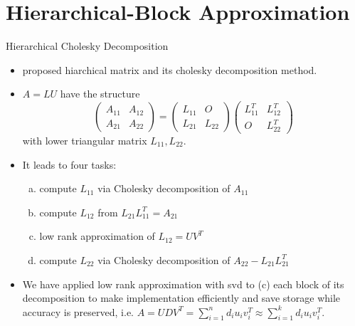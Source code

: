 \section{Hierarchical-Block Approximation}

\begin{frame}{Hierarchical Cholesky Decomposition}
\begin{itemize}
	\item \citet{hackbusch2015hierarchical} proposed hiarchical matrix and its cholesky decomposition method.
	\item $A=LU$ have the structure
	$$\begin{pmatrix}A_{11}&A_{12}\\A_{21}&A_{22}\end{pmatrix}=\begin{pmatrix}L_{11}&O\\L_{21}&L_{22}\end{pmatrix}\begin{pmatrix}L_{11}^T&L_{12}^T\\O&L_{22}^T\end{pmatrix}$$
	with lower triangular matrix $L_{11},L_{22}$.
	\item It leads to four tasks:
		\begin{enumerate}[(a)]
			\item compute $L_{11}$ via Cholesky decomposition of $A_{11}$
			\item compute $L_{12}$ from $L_{21}L_{11}^T = A_{21}$
			\item low rank approximation of $L_{12}=UV^T$
			\item compute $L_{22}$ via Cholesky decomposition of $A_{22}-L_{21}L_{21}^T$
		\end{enumerate}
	\item We have applied low rank approximation with svd to (c) each block of its decomposition to make implementation efficiently and save storage while accuracy is preserved, i.e. $A=UDV^T=\sum_{i=1}^n d_i u_iv_i^T\approx\sum_{i=1}^k d_i u_iv_i^T$.
	\end{itemize}
\end{frame}

